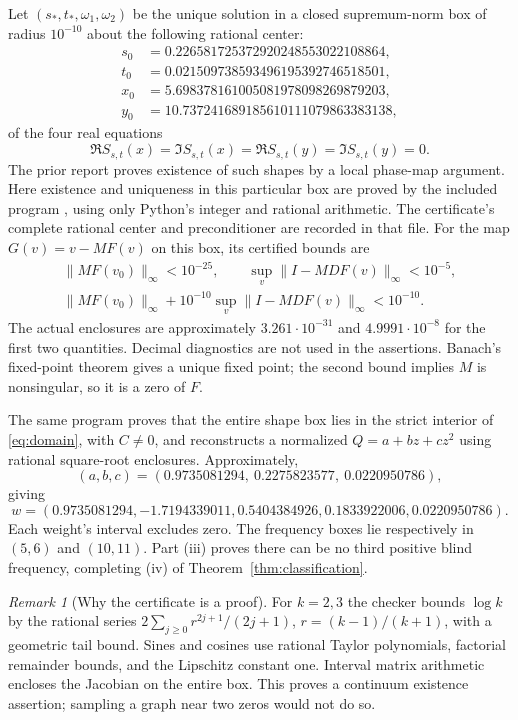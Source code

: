 \documentclass[11pt]{article}
\theoremstyle{definition}\newtheorem{definition}[theorem]{Definition}
\theoremstyle{remark}\newtheorem{remark}[theorem]{Remark}
\begin{document}
Let $(s_*,t_*,\omega_1,\omega_2)$ be the unique solution in a closed
supremum-norm box of radius $10^{-10}$ about the following rational center:
\begin{align*}
 s_0&=0.226581725372920248553022108864,\\
 t_0&=0.021509738593496195392746518501,\\
 x_0&=5.698378161005081978098269879203,\\
 y_0&=10.737241689185610111079863383138,
\end{align*}
of the four real equations
\begin{equation}\label{eq:four-eqs}
 \Re S_{s,t}(x)=\Im S_{s,t}(x)=
 \Re S_{s,t}(y)=\Im S_{s,t}(y)=0.
\end{equation}
The prior report proves existence of such shapes by a local phase-map argument.
Here existence and uniqueness in this particular box are proved by the included program
, using only Python's integer and
rational arithmetic. The certificate's complete rational center and preconditioner
are recorded in that file. For the map $G(v)=v-MF(v)$ on this box, its certified bounds are
\begin{equation}\label{eq:certificate}
 \begin{gathered}
 \|MF(v_0)\|_\infty<10^{-25},\qquad
 \sup_v\|I-MDF(v)\|_\infty<10^{-5},\\
 \|MF(v_0)\|_\infty+10^{-10}\sup_v\|I-MDF(v)\|_\infty<10^{-10}.
 \end{gathered}
\end{equation}
The actual enclosures are approximately $3.261\cdot10^{-31}$ and
$4.9991\cdot10^{-8}$ for the first two quantities. Decimal diagnostics are
not used in the assertions. Banach's fixed-point theorem gives a unique fixed
point; the second bound implies $M$ is nonsingular, so it is a zero of $F$.

The same program proves that the entire shape box lies in the strict interior
of \eqref{eq:domain}, with $C\ne0$, and reconstructs a normalized $Q=a+bz+cz^2$
using rational square-root enclosures. Approximately,
\[
 (a,b,c)=(0.9735081294,\ 0.2275823577,\ 0.0220950786),
\]
giving
\[
 w=(0.9735081294,-1.7194339011,0.5404384926,0.1833922006,0.0220950786).
\]
Each weight's interval excludes zero. The frequency boxes lie respectively in
$(5,6)$ and $(10,11)$. Part (iii) proves there can be no third positive blind
frequency, completing (iv) of Theorem~\ref{thm:classification}.

\begin{remark}[Why the certificate is a proof]
For $k=2,3$ the checker bounds $\log k$ by the rational series
$2\sum_{j\ge0}r^{2j+1}/(2j+1)$, $r=(k-1)/(k+1)$, with a geometric tail
bound. Sines and cosines use rational Taylor polynomials, factorial remainder
bounds, and the Lipschitz constant one. Interval matrix arithmetic encloses the
Jacobian on the entire box. This proves a continuum existence assertion;
sampling a graph near two zeros would not do so.
\end{remark}
\end{document}

